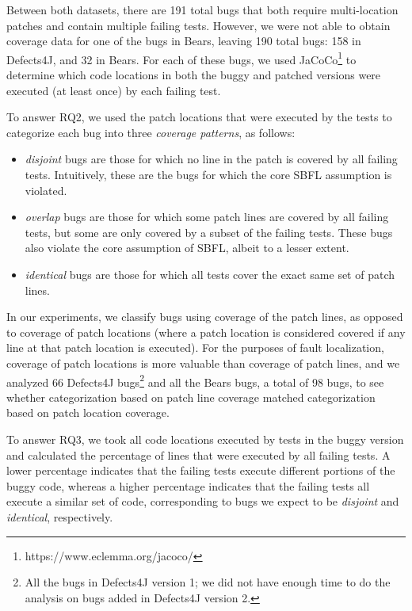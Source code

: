 \documentclass[10pt, conference]{IEEEtran}
\begin{document}
Between both datasets, there are 191 total bugs that both require multi-location
patches and contain multiple failing tests. However, we were not able to obtain coverage 
data for one of the bugs in Bears, leaving 190 total bugs: 158 in Defects4J, and 32 in
Bears. 
For each of these bugs, we used JaCoCo\footnote{https://www.eclemma.org/jacoco/}
to determine which code locations in both the buggy and patched versions were executed
(at least once) by each failing test.

To answer RQ2, we used the patch locations that were executed by the tests to categorize 
each bug into three \emph{coverage patterns}, as follows:
\begin{itemize}
\item \emph{disjoint} bugs are those for which no line in the patch is covered by all
failing tests.  Intuitively, these are the bugs for which the core SBFL
assumption is violated.
\item \emph{overlap} bugs are those for which some patch lines are covered
by all failing tests, but some are only covered by a subset of the failing
tests. These bugs also violate the core assumption of SBFL, albeit to a lesser
extent.
\item \emph{identical} bugs are those for which all tests cover the exact same
  set of patch lines.
\end{itemize}

In our experiments, we classify bugs using coverage of the patch lines, as opposed to 
coverage of 
patch locations (where a patch location is considered covered if any line at that patch location 
is 
executed). For the purposes of fault localization, coverage of patch locations is more valuable 
than coverage of patch lines, and we analyzed 66 Defects4J bugs\footnote{All the
bugs in Defects4J version 1; we did not have enough time to do the analysis on bugs added in 
Defects4J version 2.}  and all the Bears bugs, a total of 98 bugs, to see whether categorization 
based on patch line 
coverage matched categorization based on patch location coverage.

To answer RQ3, we took all code locations executed by tests in the buggy version and
calculated the percentage of lines that were executed by all failing tests. 
A lower percentage indicates that the failing tests execute different portions of the buggy 
code, whereas a higher percentage indicates that the failing tests all execute a similar
set of code, corresponding to bugs we expect to be \emph{disjoint} and \emph{identical},
respectively.
\end{document}
